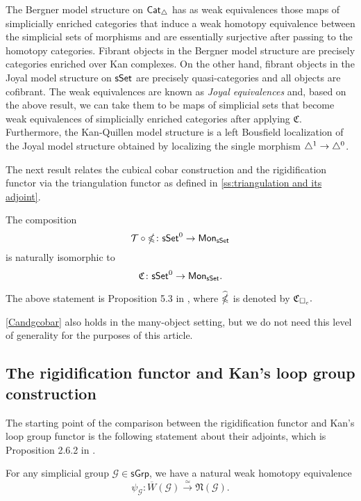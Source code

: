 \begin{remark}
	The Bergner model structure on $\mathsf{Cat}_{\triangle}$ has as weak equivalences those maps of simplicially enriched categories that induce a weak homotopy equivalence between the simplicial sets of morphisms and are essentially surjective after passing to the homotopy categories.
	Fibrant objects in the Bergner model structure are precisely categories enriched over Kan complexes.
	On the other hand, fibrant objects in the Joyal model structure on $\mathsf{sSet}$ are precisely quasi-categories and all objects are cofibrant.
	The weak equivalences are known as \textit{Joyal equivalences} and, based on the above result, we can take them to be maps of simplicial sets that become weak equivalences of simplicially enriched categories after applying $\mathfrak{C}$.
	Furthermore, the Kan-Quillen model structure is a left Bousfield localization of the Joyal model structure obtained by localizing the single morphism $\triangle^1 \to \triangle^0$.
\end{remark}

The next result relates the cubical cobar construction and the rigidification functor via the triangulation functor as defined in  \cref{ss:triangulation and its adjoint}.

\begin{proposition}\label{Candgcobar}
	The composition 
	$$\mathcal{T} \circ \operatorname{\mathbb{\Omega}} \colon \mathsf{sSet}^0 \to \mathsf{Mon}_{\mathsf{sSet}}$$ is naturally isomorphic to
	$$\mathfrak{C} \colon \mathsf{sSet}^0 \to \mathsf{Mon}_{\mathsf{sSet}}.$$
\end{proposition}

The above statement is Proposition 5.3 in \cite{rivera2018cubical}, where $\widehat{\operatorname{\mathbb{\Omega}}}$ is denoted by $\mathfrak{C}_{\square_c}.$

\cref{Candgcobar} also holds in the many-object setting, but we do not need this level of generality for the purposes of this article.




\subsection{The rigidification functor and Kan's loop group construction}

The starting point of the comparison between the rigidification functor and Kan's loop group functor is the following statement about their adjoints, which is Proposition 2.6.2 in \cite{hinich2007deformation}.

\begin{proposition} \label{hinich}
	For any simplicial group $\mathcal{G} \in \mathsf{sGrp}$, we have a natural weak homotopy equivalence
	$$\psi_{\mathcal{G}} \colon \overline{W}(\mathcal{G}) \xrightarrow{\simeq} \mathfrak{N}(\mathcal{G}).$$
\end{proposition} 

